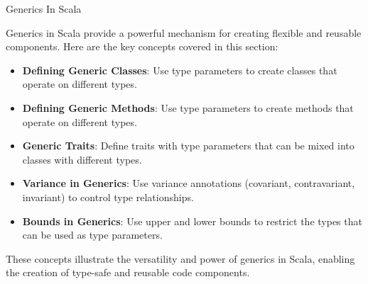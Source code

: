 \begin{notes}{Generics In Scala}
\begin{highlight}
    \end{highlight}
    
    \begin{highlight}
    
        Generics in Scala provide a powerful mechanism for creating flexible and reusable components. Here are the key concepts covered in this section:
    
        \begin{itemize}
            \item \textbf{Defining Generic Classes}: Use type parameters to create classes that operate on different types.
            \item \textbf{Defining Generic Methods}: Use type parameters to create methods that operate on different types.
            \item \textbf{Generic Traits}: Define traits with type parameters that can be mixed into classes with different types.
            \item \textbf{Variance in Generics}: Use variance annotations (covariant, contravariant, invariant) to control type relationships.
            \item \textbf{Bounds in Generics}: Use upper and lower bounds to restrict the types that can be used as type parameters.
        \end{itemize}
    
        These concepts illustrate the versatility and power of generics in Scala, enabling the creation of type-safe and reusable code components.
    
    \end{highlight}
\end{notes}